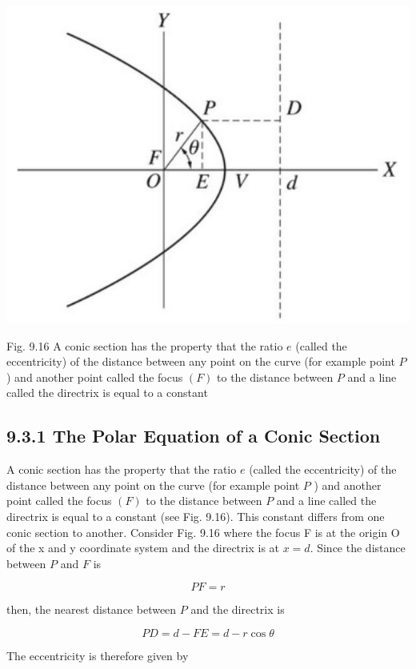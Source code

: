 \documentclass[10pt]{article}
\begin{document}
\begin{center}
\includegraphics[max width=\textwidth]{2024_09_13_db1f357d2aad0a03eb2eg-152(1)}
\end{center}

Fig. 9.16 A conic section has the property that the ratio $e$ (called the eccentricity) of the distance between any point on the curve (for example point $P$ ) and another point called the focus $(F)$ to the distance between $P$ and a line called the directrix is equal to a constant

\subsection*{9.3.1 The Polar Equation of a Conic Section}
A conic section has the property that the ratio $e$ (called the eccentricity) of the distance between any point on the curve (for example point $P$ ) and another point called the focus $(F)$ to the distance between $P$ and a line called the directrix is equal to a constant (see Fig. 9.16). This constant differs from one conic section to another. Consider Fig. 9.16 where the focus F is at the origin O of the x and y coordinate system and the directrix is at $x=d$. Since the distance between $P$ and $F$ is

$$
P F=r
$$

then, the nearest distance between $P$ and the directrix is

$$
P D=d-F E=d-r \cos \theta
$$

The eccentricity is therefore given by
\end{document}
